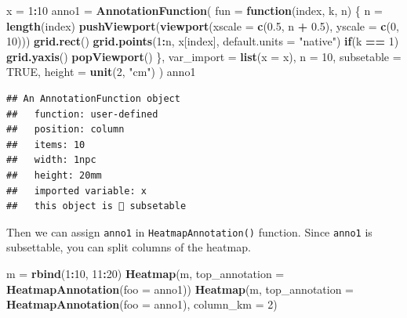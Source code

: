 \documentclass[]{book}
\newenvironment{Shaded}{\begin{snugshade}}{\end{snugshade}}
\newcommand{\KeywordTok}[1]{\textcolor[rgb]{0.13,0.29,0.53}{\textbf{#1}}}
\newcommand{\DataTypeTok}[1]{\textcolor[rgb]{0.13,0.29,0.53}{#1}}
\newcommand{\DecValTok}[1]{\textcolor[rgb]{0.00,0.00,0.81}{#1}}
\newcommand{\FloatTok}[1]{\textcolor[rgb]{0.00,0.00,0.81}{#1}}
\newcommand{\StringTok}[1]{\textcolor[rgb]{0.31,0.60,0.02}{#1}}
\newcommand{\OtherTok}[1]{\textcolor[rgb]{0.56,0.35,0.01}{#1}}
\newcommand{\ControlFlowTok}[1]{\textcolor[rgb]{0.13,0.29,0.53}{\textbf{#1}}}
\newcommand{\OperatorTok}[1]{\textcolor[rgb]{0.81,0.36,0.00}{\textbf{#1}}}
\newcommand{\NormalTok}[1]{#1}
\theoremstyle{definition}
\theoremstyle{definition}
\theoremstyle{definition}
\theoremstyle{remark}
\begin{document}
\begin{Shaded}
\begin{Highlighting}[]
\NormalTok{x =}\StringTok{ }\DecValTok{1}\OperatorTok{:}\DecValTok{10}
\NormalTok{anno1 =}\StringTok{ }\KeywordTok{AnnotationFunction}\NormalTok{(}
    \DataTypeTok{fun =} \ControlFlowTok{function}\NormalTok{(index, k, n) \{}
\NormalTok{        n =}\StringTok{ }\KeywordTok{length}\NormalTok{(index)}
        \KeywordTok{pushViewport}\NormalTok{(}\KeywordTok{viewport}\NormalTok{(}\DataTypeTok{xscale =} \KeywordTok{c}\NormalTok{(}\FloatTok{0.5}\NormalTok{, n }\OperatorTok{+}\StringTok{ }\FloatTok{0.5}\NormalTok{), }\DataTypeTok{yscale =} \KeywordTok{c}\NormalTok{(}\DecValTok{0}\NormalTok{, }\DecValTok{10}\NormalTok{)))}
        \KeywordTok{grid.rect}\NormalTok{()}
        \KeywordTok{grid.points}\NormalTok{(}\DecValTok{1}\OperatorTok{:}\NormalTok{n, x[index], }\DataTypeTok{default.units =} \StringTok{"native"}\NormalTok{)}
        \ControlFlowTok{if}\NormalTok{(k }\OperatorTok{==}\StringTok{ }\DecValTok{1}\NormalTok{) }\KeywordTok{grid.yaxis}\NormalTok{()}
        \KeywordTok{popViewport}\NormalTok{()}
\NormalTok{    \},}
    \DataTypeTok{var_import =} \KeywordTok{list}\NormalTok{(}\DataTypeTok{x =}\NormalTok{ x),}
    \DataTypeTok{n =} \DecValTok{10}\NormalTok{,}
    \DataTypeTok{subsetable =} \OtherTok{TRUE}\NormalTok{,}
    \DataTypeTok{height =} \KeywordTok{unit}\NormalTok{(}\DecValTok{2}\NormalTok{, }\StringTok{"cm"}\NormalTok{)}
\NormalTok{)}
\NormalTok{anno1}
\end{Highlighting}
\end{Shaded}

\begin{verbatim}
## An AnnotationFunction object
##   function: user-defined
##   position: column 
##   items: 10 
##   width: 1npc 
##   height: 20mm 
##   imported variable: x 
##   this object is  subsetable
\end{verbatim}

Then we can assign \texttt{anno1} in \texttt{HeatmapAnnotation()}
function. Since \texttt{anno1} is subsettable, you can split columns of
the heatmap.

\begin{Shaded}
\begin{Highlighting}[]
\NormalTok{m =}\StringTok{ }\KeywordTok{rbind}\NormalTok{(}\DecValTok{1}\OperatorTok{:}\DecValTok{10}\NormalTok{, }\DecValTok{11}\OperatorTok{:}\DecValTok{20}\NormalTok{)}
\KeywordTok{Heatmap}\NormalTok{(m, }\DataTypeTok{top_annotation =} \KeywordTok{HeatmapAnnotation}\NormalTok{(}\DataTypeTok{foo =}\NormalTok{ anno1))}
\KeywordTok{Heatmap}\NormalTok{(m, }\DataTypeTok{top_annotation =} \KeywordTok{HeatmapAnnotation}\NormalTok{(}\DataTypeTok{foo =}\NormalTok{ anno1), }\DataTypeTok{column_km =} \DecValTok{2}\NormalTok{)}
\end{Highlighting}
\end{Shaded}
\end{document}
